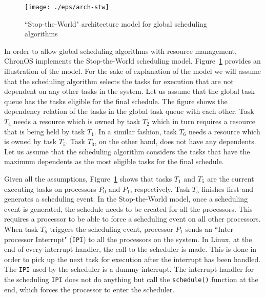 \documentclass[12pt,dvips]{report}
\begin{document}
\begin{figure} [htb]
  \centering
  \texttt{[image: ./eps/arch-stw]}
  \caption{``Stop-the-World" architecture model for global scheduling algorithms}
  \label{fig:arch-stw}
\end{figure}

In order to allow global scheduling algorithms with resource management, ChronOS implements the Stop-the-World scheduling model. Figure~\ref{fig:arch-stw} provides an illustration of the model. For the sake of explanation of the model we will assume that the scheduling algorithm selects the tasks for execution that are not dependent on any other tasks in the system. Let us assume that the global task queue has the tasks eligible for the final schedule. The figure shows the dependency relation of the tasks in the global task queue with each other. Task $T_4$ needs a resource which is owned by task $T_2$ which in turn requires a resource that is being held by task $T_1$. In a similar fashion, task $T_6$ needs a resource which is owned by task $T_5$. Task $T_3$, on the other hand, does not have any dependents. Let us assume that the scheduling algorithm considers the tasks that have the maximum dependents as the most eligible tasks for the final schedule.

Given all the assumptions, Figure~\ref{fig:arch-stw} shows that tasks $T_1$ and $T_5$ are the current executing tasks on processors $P_0$ and $P_1$, respectively. Task $T_5$ finishes first and generates a scheduling event. In the Stop-the-World model, once a scheduling event is generated, the schedule needs to be created for all the processors. This requires a processor to be able to force a scheduling event on all other processors. When task $T_5$ triggers the scheduling event, processor $P_1$ sends an ``Inter-processor Interrupt" (\texttt{IPI}) to all the processors on the system. In Linux, at the end of every interrupt handler, the call to the scheduler is made. This is done in order to pick up the next task for execution after the interrupt has been handled. The \texttt{IPI} used by the scheduler is a dummy interrupt. The interrupt handler for the scheduling \texttt{IPI} does not do anything but call the \texttt{schedule()} function at the end, which forces the processor to enter the scheduler.
\end{document}
